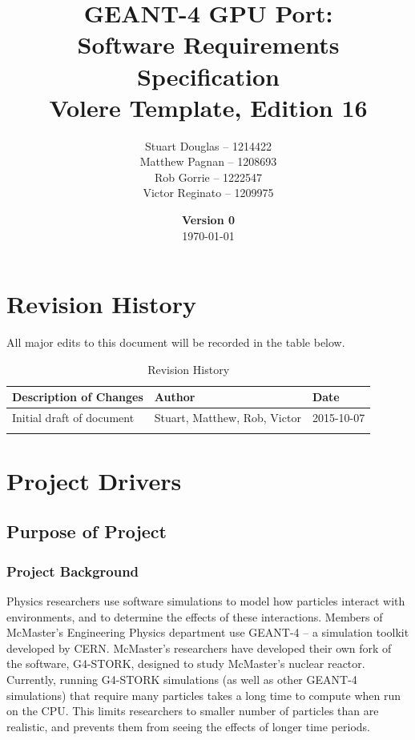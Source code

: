 \documentclass[12pt]{article}
\title{
\LARGE GEANT-4 GPU Port:
\\\vspace{10mm}
\large \textbf{Software Requirements Specification}
\\Volere Template, Edition 16
\vspace{40mm}
}
\author{
Stuart Douglas -- 1214422
\\Matthew Pagnan -- 1208693
\\Rob Gorrie -- 1222547
\\Victor Reginato -- 1209975
\vspace{10mm}
}
\date{\vfill \textbf{Version 0}\\ \today}
\begin{document}

\maketitle
\newpage

\tableofcontents
\newpage
{}
\restoregeometry

\section{Revision History}
All major edits to this document will be recorded in the table below.

\begin{table}[h]
\centering
\caption{Revision History}
\begin{tabular}{|l|l|l|}
\Xhline{2\arrayrulewidth}
\bf Description of Changes & \bf Author & \bf Date\\\hline
Initial draft of document & Stuart, Matthew, Rob, Victor & 2015-10-07\\
\Xhline{2\arrayrulewidth}
\end{tabular}
\end{table}

\section{Project Drivers}

\subsection{Purpose of Project} %
\subsubsection{Project Background}
Physics researchers use software simulations to model how particles interact with environments, and to determine the effects of these interactions. Members of McMaster's Engineering Physics department use GEANT-4 -- a simulation toolkit developed by CERN. McMaster's researchers have developed their own fork of the software, G4-STORK, designed to study McMaster's nuclear reactor. Currently, running G4-STORK simulations (as well as other GEANT-4 simulations) that require many particles takes a long time to compute when run on the CPU. This limits researchers to smaller number of particles than are realistic, and prevents them from seeing the effects of longer time periods.
\end{document}
